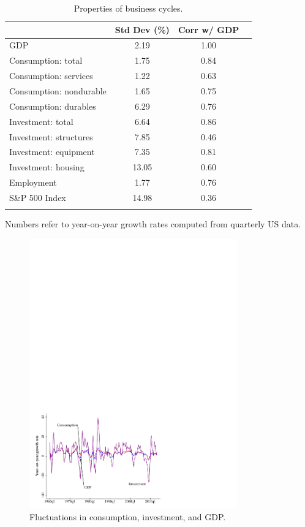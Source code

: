 \begin{table}[h!]
\centering
\caption{Properties of business cycles.}
\label{tab:cycleprops}
\begin{tabular*}{0.8\textwidth}{l@{\extracolsep{\fill}}ccc}
\toprule
        &  Std Dev (\%)  &  Corr w/ GDP  \\
\midrule
GDP     &      2.19          &    1.00      \\
Consumption:  total      &  1.75  &  0.84   \\
Consumption:  services   &  1.22  &  0.63   \\
Consumption:  nondurable &  1.65  &  0.75   \\
Consumption:  durables   &  6.29  &  0.76   \\
Investment:  total       &  6.64  &  0.86   \\
Investment:  structures  &  7.85  &  0.46   \\
Investment:  equipment   &  7.35  &  0.81   \\
Investment:  housing     &  13.05\phantom{1} &  0.60   \\
Employment               &  1.77  &  0.76   \\
S\&P 500 Index           &  14.98\phantom{1}  &  0.36   \\
\bottomrule
\addlinespace
\end{tabular*}
\begin{minipage}{0.8\textwidth}
\footnotesize{Numbers refer to year-on-year growth rates computed from quarterly US data.}
\end{minipage}
\end{table}

\begin{figure}[h!]
    \caption{Fluctuations in consumption, investment, and GDP.}
    \label{fig:gcall}%
    \centering
    \includegraphics[width=0.8\textwidth]{Figures/us_inv_cons_gdp.pdf}
\end{figure}

